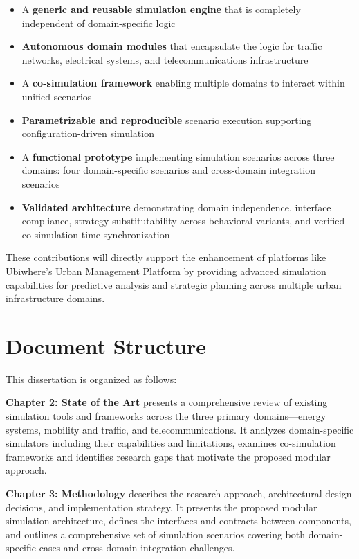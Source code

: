 \begin{itemize}
    \item A \textbf{generic and reusable simulation engine} that is completely independent of domain-specific logic
    \item \textbf{Autonomous domain modules} that encapsulate the logic for traffic networks, electrical systems, and telecommunications infrastructure
    \item A \textbf{co-simulation framework} enabling multiple domains to interact within unified scenarios
    \item \textbf{Parametrizable and reproducible} scenario execution supporting configuration-driven simulation
    \item A \textbf{functional prototype} implementing simulation scenarios across three domains: four domain-specific scenarios and cross-domain integration scenarios
    \item \textbf{Validated architecture} demonstrating domain independence, interface compliance, strategy substitutability across behavioral variants, and verified co-simulation time synchronization
\end{itemize}

These contributions will directly support the enhancement of platforms like Ubiwhere's Urban Management Platform by providing advanced simulation capabilities for predictive analysis and strategic planning across multiple urban infrastructure domains.


\section{Document Structure}

This dissertation is organized as follows:

\textbf{Chapter 2: State of the Art} presents a comprehensive review of existing simulation tools and frameworks across the three primary domains—energy systems, mobility and traffic, and telecommunications. It analyzes domain-specific simulators including their capabilities and limitations, examines co-simulation frameworks and identifies research gaps that motivate the proposed modular approach.

\textbf{Chapter 3: Methodology} describes the research approach, architectural design decisions, and implementation strategy. It presents the proposed modular simulation architecture, defines the interfaces and contracts between components, and outlines a comprehensive set of simulation scenarios covering both domain-specific cases and cross-domain integration challenges.

